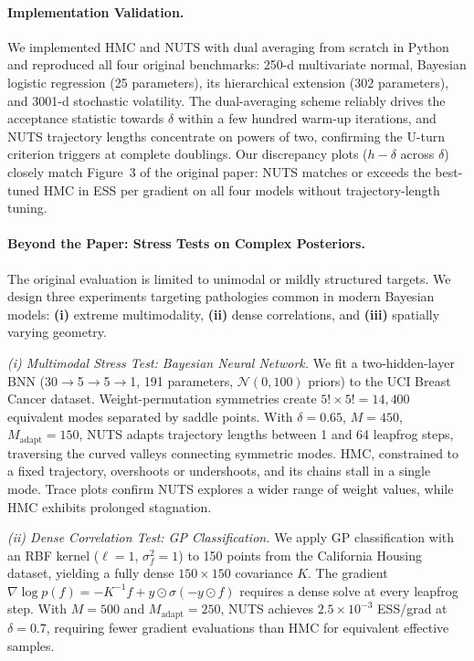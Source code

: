\documentclass{article}
\begin{document}
\paragraph{Implementation Validation.}
We implemented HMC and NUTS with dual averaging from scratch in Python and reproduced all four original benchmarks: 250-d multivariate normal, Bayesian logistic regression (25 parameters), its hierarchical extension (302 parameters), and 3001-d stochastic volatility. The dual-averaging scheme reliably drives the acceptance statistic towards $\delta$ within a few hundred warm-up iterations, and NUTS trajectory lengths concentrate on powers of two, confirming the U-turn criterion triggers at complete doublings. Our discrepancy plots ($h - \delta$ across $\delta$) closely match Figure~3 of the original paper: NUTS matches or exceeds the best-tuned HMC in ESS per gradient on all four models without trajectory-length tuning.

\paragraph{Beyond the Paper: Stress Tests on Complex Posteriors.}
The original evaluation is limited to unimodal or mildly structured targets. We design three experiments targeting pathologies common in modern Bayesian models: \textbf{(i)} extreme multimodality, \textbf{(ii)} dense correlations, and \textbf{(iii)} spatially varying geometry.

\vspace{0.1cm}
\noindent\textit{(i) Multimodal Stress Test: Bayesian Neural Network.}
We fit a two-hidden-layer BNN (30$\to$5$\to$5$\to$1, 191 parameters, $\mathcal{N}(0,100)$ priors) to the UCI Breast Cancer dataset. Weight-permutation symmetries create $5!\times5!=14{,}400$ equivalent modes separated by saddle points. With $\delta=0.65$, $M=450$, $M_{\text{adapt}}=150$, NUTS adapts trajectory lengths between 1 and 64 leapfrog steps, traversing the curved valleys connecting symmetric modes. HMC, constrained to a fixed trajectory, overshoots or undershoots, and its chains stall in a single mode. Trace plots confirm NUTS explores a wider range of weight values, while HMC exhibits prolonged stagnation.

\noindent\textit{(ii) Dense Correlation Test: GP Classification.}
We apply GP classification with an RBF kernel ($\ell=1$, $\sigma_f^2=1$) to 150 points from the California Housing dataset, yielding a fully dense $150\times150$ covariance $K$. The gradient $\nabla\log p(f) = -K^{-1}f + y\odot\sigma(-y\odot f)$ requires a dense solve at every leapfrog step. With $M=500$ and $M_{\text{adapt}}=250$, NUTS achieves $2.5\times10^{-3}$ ESS/grad at $\delta=0.7$, requiring fewer gradient evaluations than HMC for equivalent effective samples.
\end{document}
